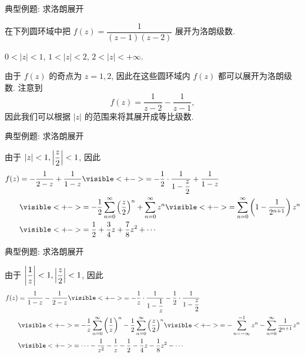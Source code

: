\begin{frame}{典型例题: 求洛朗展开}
\begin{example}
在下列圆环域中把 $f(z)=\dfrac1{(z-1)(z-2)}$ 展开为洛朗级数.

\onslide<+->
 $0<|z|<1$,  $1<|z|<2$,  $2<|z|<+\infty$. 
\end{example}
\begin{solution}
由于 $f(z)$ 的奇点为 $z=1,2$, 因此在这些圆环域内 $f(z)$ 都可以展开为洛朗级数.
\onslide<+->
注意到
\[f(z)=\frac1{z-2}-\frac1{z-1},\]
因此我们可以根据 $|z|$ 的范围来将其展开成等比级数.
\end{solution}
\end{frame}


\begin{frame}{典型例题: 求洛朗展开}
\begin{solutionc}
 由于 $|z|<1,\left|\dfrac z2\right|<1$,
\onslide<+->
因此
\begin{align*}
f(z)&=-\frac1{2-z}+\frac1{1-z}
\visible<+->{=-\frac12\cdot\frac1{1-\dfrac z2}+\frac1{1-z}}\\
&\visible<+->{=-\frac12\sum_{n=0}^\infty\left(\frac z2\right)^n+\sum_{n=0}^\infty z^n}
\visible<+->{=\sum_{n=0}^\infty\left(1-\frac1{2^{n+1}}\right)z^n}\\
&\visible<+->{=\frac12+\frac34z+\frac78z^2+\cdots}
\end{align*}
\end{solutionc}
\end{frame}


\begin{frame}{典型例题: 求洛朗展开}
\begin{solutionc}
 由于 $\left|\dfrac1z\right|<1,\left|\dfrac z2\right|<1$, 
\onslide<+->
因此
\begin{align*}
f(z)&=\frac1{1-z}-\frac1{2-z}
\visible<+->{=-\frac1z\cdot\frac1{1-\dfrac1z}-\frac12\cdot\frac1{1-\dfrac z2}}\\
&\visible<+->{=-\frac1z\sum_{n=0}^\infty \left(\frac1z\right)^n-\frac12\sum_{n=0}^\infty\left(\frac z2\right)^n}
\visible<+->{=-\sum_{n=-\infty}^{-1}z^n-\sum_{n=0}^\infty\frac1{2^{n+1}}z^n}\\
&\visible<+->{=\cdots-\frac1{z^2}-\frac1z-\frac12-\frac14z-\frac18z^2-\cdots}
\end{align*}
\end{solutionc}
\end{frame}


